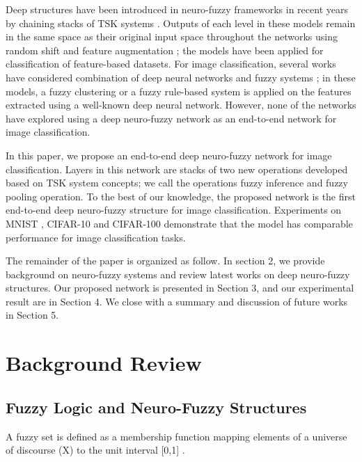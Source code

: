 \documentclass{article}
\begin{document}
Deep structures have been introduced in neuro-fuzzy frameworks in recent years by chaining stacks of TSK systems \citep{rajurkar2017developing,zhang2018deep,zhou2017stacked,zhou2017deep}. Outputs of each level in these models remain in the same space as their original input space throughout the networks using random shift \citep{zhou2017deep} and feature augmentation \citep{zhou2017stacked,zhang2018deep}; the models have been applied for classification of feature-based datasets. For image classification, several works have considered combination of deep neural networks and fuzzy systems \citep{gu2018semi,yeganejou2018classification,riaz2019semi}; in these models, a fuzzy clustering or a fuzzy rule-based system is applied on the features extracted using a well-known deep neural network. However, none of the networks have explored using a deep neuro-fuzzy network as an end-to-end network for image classification.

In this paper, we propose an end-to-end deep neuro-fuzzy network for image classification. Layers in this network are stacks of two new operations developed based on TSK system concepts; we call the operations fuzzy inference and fuzzy pooling operation. To the best of our knowledge, the proposed network is the first end-to-end deep neuro-fuzzy structure for image classification. Experiments on MNIST \citep{lecun1998gradient}, CIFAR-10 and CIFAR-100 \citep{krizhevsky2009learning} demonstrate that the model has comparable performance for image classification tasks.

The remainder of the paper is organized as follow. In section 2, we provide background on neuro-fuzzy systems and review latest works on deep neuro-fuzzy structures. Our proposed network is presented in Section 3, and our experimental result are in Section 4. We close with a summary and discussion of future works in Section 5.

\section{Background Review}

\subsection{Fuzzy Logic and Neuro-Fuzzy Structures}

A fuzzy set is defined as a membership function mapping elements of a universe of discourse (X) to the unit interval [0,1] \citep{zadeh1996fuzzy}.
\end{document}
